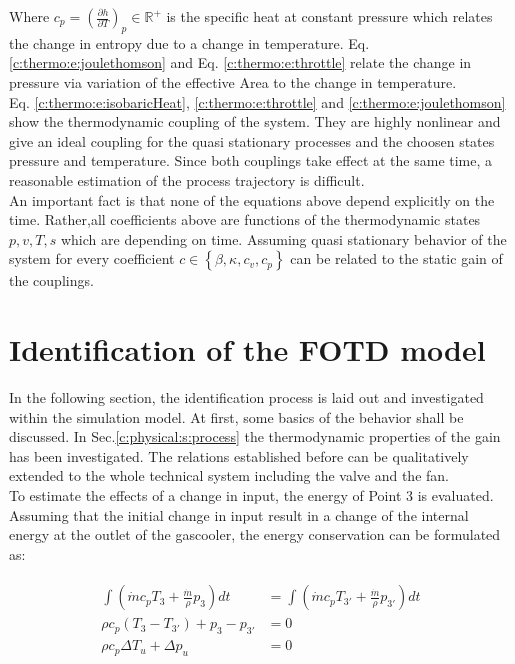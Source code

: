 Where $c_p = \left(\frac{\partial h}{\partial T} \right)_p \in \mathbb{R}^+$ is the specific heat at constant pressure which relates the change in entropy due to a change in temperature.
Eq. \ref{c:thermo:e:joulethomson} and Eq. \ref{c:thermo:e:throttle} relate the change in pressure via variation of the effective Area to the change in temperature. \\

Eq. \ref{c:thermo:e:isobaricHeat}, \ref{c:thermo:e:throttle} and \ref{c:thermo:e:joulethomson} show the thermodynamic coupling of the system. They are highly nonlinear and give an ideal coupling for the quasi stationary processes and the choosen states pressure and temperature. Since both couplings take effect at the same time, a reasonable estimation of the process trajectory is difficult. \\

An important fact is that none of the equations above depend explicitly on the time. Rather,all coefficients above are functions of the thermodynamic states $p,v,T,s$ which are depending on time. Assuming quasi stationary behavior of the system for every coefficient $c \in \left\lbrace \beta, \kappa, c_v, c_p \right\rbrace$ can be related to the static gain of the couplings.\\

\section{Identification of the FOTD model} \label{c:physical:s:identification}

In the following section, the identification process is laid out and investigated within the simulation model. At first, some basics of the behavior shall be discussed. In Sec.\ref{c:physical:s:process} the thermodynamic properties of the gain has been investigated. The relations established before can be qualitatively extended to the whole technical system including the valve and the fan.\\

To estimate the effects of a change in input, the energy of Point 3 is evaluated. Assuming that the initial change in input result in a change of the internal energy at the outlet of the gascooler, the energy conservation can be formulated as:

\begin{align*}
\begin{split}
\int \left(\dot{m} c_p T_3 + \frac{\dot{m}}{\rho} p_3 \right) dt &=
\int \left(\dot{m} c_p T_{3'} + \frac{\dot{m}}{\rho} p_{3'} \right) dt \\
\rho c_p\left(T_{3} - T_{3'}\right)  + p_{3} - p_{3'} &= 0 \\
\rho c_p \Delta T_u + \Delta p_u &= 0
\end{split}
\end{align*}

